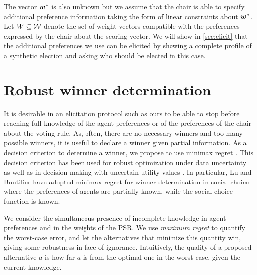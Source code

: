\documentclass[runningheads]{llncs}
\begin{document}
The vector $\bm{w}^*$  is also unknown but we assume that the chair is able to specify additional preference information taking the form of linear constraints about $\bm{w}^*$. Let $W \subseteq \mathcal{W}$ denote the set of weight vectors compatible with the preferences expressed by the chair about the scoring vector.
We will show in \cref{sec:elicit} that the additional preferences we use can be elicited by showing a complete profile of a synthetic election and asking who should be elected in this case.

\section{Robust winner determination}
\label{sec:mmr}
It is desirable in an elicitation protocol such as ours to be able to stop before reaching full knowledge of the agent preferences or of the preferences of the chair about the voting rule. As, often, there are no necessary winners and too many possible winners, it is useful to declare a winner given partial information.
As a decision criterion to determine a winner, we propose to use minimax regret \cite{Savage1954}. 
This decision criterion has been used for robust optimization under data uncertainty \cite{Kouvelis1997} as well as in decision-making with uncertain utility values \cite{Salo2001,Boutilier2006}.
In particular, Lu and Boutilier \cite{Lu2011} have adopted minimax regret for winner determination in social choice where
the preferences of agents are partially known, while the social choice function is known.

We consider the simultaneous presence of incomplete knowledge in agent preferences and in the weights of the PSR.
We use \emph{maximum regret} to quantify the worst-case error, and let the alternatives that minimize this quantity win, giving some robustness in face of ignorance.
Intuitively, the quality of a proposed alternative $a$ is how far $a$ is from the optimal one in the worst case, given the current knowledge.
\end{document}
